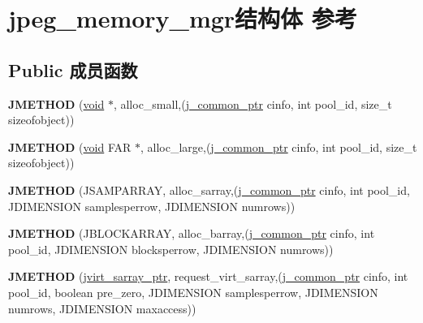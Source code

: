 \hypertarget{structjpeg__memory__mgr}{}\section{jpeg\+\_\+memory\+\_\+mgr结构体 参考}
\label{structjpeg__memory__mgr}
\subsection*{Public 成员函数}
\begin{DoxyCompactItemize}
\item 
\mbox{\label{structjpeg__memory__mgr_a9372ad24444dda23175cc9203105911c}} 
{\bfseries J\+M\+E\+T\+H\+OD} (\hyperlink{interfacevoid}{void} $\ast$, alloc\+\_\+small,(\hyperlink{structjpeg__common__struct}{j\+\_\+common\+\_\+ptr} cinfo, int pool\+\_\+id, size\+\_\+t sizeofobject))
\item 
\mbox{\label{structjpeg__memory__mgr_a130f6dbc700cc045bdbe35beff2cb326}} 
{\bfseries J\+M\+E\+T\+H\+OD} (\hyperlink{interfacevoid}{void} F\+AR $\ast$, alloc\+\_\+large,(\hyperlink{structjpeg__common__struct}{j\+\_\+common\+\_\+ptr} cinfo, int pool\+\_\+id, size\+\_\+t sizeofobject))
\item 
\mbox{\label{structjpeg__memory__mgr_a3fdd2e1dfdc089fd61f17b608c0263f2}} 
{\bfseries J\+M\+E\+T\+H\+OD} (J\+S\+A\+M\+P\+A\+R\+R\+AY, alloc\+\_\+sarray,(\hyperlink{structjpeg__common__struct}{j\+\_\+common\+\_\+ptr} cinfo, int pool\+\_\+id, J\+D\+I\+M\+E\+N\+S\+I\+ON samplesperrow, J\+D\+I\+M\+E\+N\+S\+I\+ON numrows))
\item 
\mbox{\label{structjpeg__memory__mgr_aefc8abe884dab5648c1e4e7ada2e2e18}} 
{\bfseries J\+M\+E\+T\+H\+OD} (J\+B\+L\+O\+C\+K\+A\+R\+R\+AY, alloc\+\_\+barray,(\hyperlink{structjpeg__common__struct}{j\+\_\+common\+\_\+ptr} cinfo, int pool\+\_\+id, J\+D\+I\+M\+E\+N\+S\+I\+ON blocksperrow, J\+D\+I\+M\+E\+N\+S\+I\+ON numrows))
\item 
\mbox{\label{structjpeg__memory__mgr_a34b830d9d7b2f4fd043e98421a700503}} 
{\bfseries J\+M\+E\+T\+H\+OD} (\hyperlink{structjvirt__sarray__control}{jvirt\+\_\+sarray\+\_\+ptr}, request\+\_\+virt\+\_\+sarray,(\hyperlink{structjpeg__common__struct}{j\+\_\+common\+\_\+ptr} cinfo, int pool\+\_\+id, boolean pre\+\_\+zero, J\+D\+I\+M\+E\+N\+S\+I\+ON samplesperrow, J\+D\+I\+M\+E\+N\+S\+I\+ON numrows, J\+D\+I\+M\+E\+N\+S\+I\+ON maxaccess))

\end{DoxyCompactItemize}

